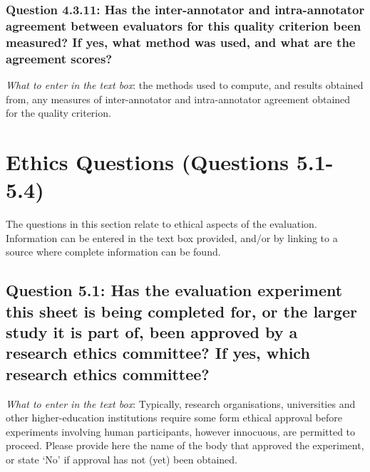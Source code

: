 \documentclass[11pt,a4paper]{article}
\begin{document}
\vspace{-.3cm}
\subsubsection*{Question 4.3.11:  Has the inter-annotator and intra-annotator agreement between evaluators for this quality criterion been measured? If yes, what method was used, and what are the agreement scores?}

\noindent\textit{What to enter in the text box}: the methods used to compute, and results obtained from, any measures of inter-annotator and intra-annotator agreement obtained for the quality criterion.



\section{Ethics Questions (Questions 5.1-5.4)}\label{sec:ethics}

The questions in this section relate to ethical aspects of the evaluation. Information can be entered in the text box provided, and/or by linking to a source where complete information can be found.

\vspace{-.3cm}
\subsection*{Question 5.1: Has the evaluation experiment this sheet is being completed for, or the larger study it is part of, been approved by a research ethics committee? If yes, which research ethics committee?}
\vspace{-.1cm}


\vspace{.3cm}
\noindent\textit{What to enter in the text box}: Typically, research organisations, universities and other higher-education institutions require some form ethical approval before experiments involving human participants, however innocuous, are permitted to proceed. Please provide here the name of the body that approved the experiment, or state `No' if approval has not (yet) been obtained.
\end{document}
